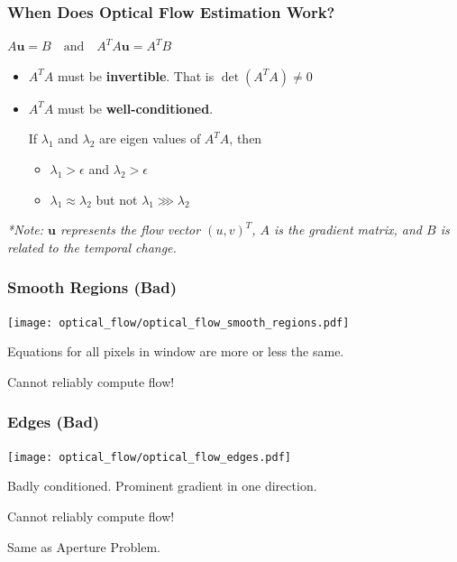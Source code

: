 \begin{frame}
    \frametitle{When Does Optical Flow Estimation Work?}
    
    \begin{center}
        $\boxed{A\mathbf{u} = B} \quad \text{and} \quad \boxed{A^T A\mathbf{u} = A^T B}$
    \end{center}
    
    \vspace{0.5em}
    
    \begin{itemize}
        \item $A^T A$ must be \textbf{invertible}. That is $\det(A^T A) \neq 0$
        \item $A^T A$ must be \textbf{well-conditioned}.
        
        \vspace{0.2em}
        If $\lambda_1$ and $\lambda_2$ are eigen values of $A^T A$, then
        \begin{itemize}
            \item $\lambda_1 > \epsilon$ and $\lambda_2 > \epsilon$
            \item $\lambda_1 \approx \lambda_2$ but not $\lambda_1 \ggg \lambda_2$
        \end{itemize}
    \end{itemize}
    
    \vspace{1em}
    \small{\textit{*Note: $\mathbf{u}$ represents the flow vector $(u, v)^T$, $A$ is the gradient matrix, and $B$ is related to the temporal change.}}
\end{frame}


\begin{frame}
    \frametitle{Smooth Regions (Bad)}
    \begin{center}
      \texttt{[image: optical\_flow/optical\_flow\_smooth\_regions.pdf]}
    \end{center}
  
    Equations for all pixels in window are more or less the same.

    Cannot reliably compute flow!

\end{frame}

\begin{frame}
    \frametitle{Edges (Bad)}
    \begin{center}
      \texttt{[image: optical\_flow/optical\_flow\_edges.pdf]}
    \end{center}

    Badly conditioned. Prominent gradient in one direction.
    
    Cannot reliably compute flow!
    
    Same as Aperture Problem.
 \end{frame}

